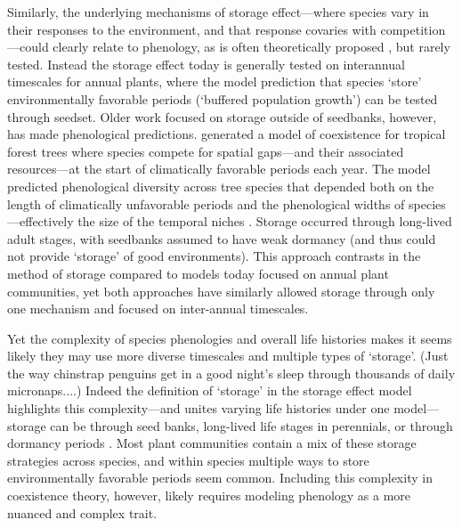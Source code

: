 \documentclass[11pt]{article}
\begin{document}
Similarly, the underlying mechanisms of storage effect---where species vary in their responses to the environment, and that response covaries with competition---could clearly relate to phenology, as is often theoretically proposed \citep{Chesson:1993gi,Chesson:2004eo}, but rarely tested. Instead the storage effect today is generally tested on interannual timescales for annual plants, where the model prediction that species `store' environmentally favorable periods (`buffered population growth') can be tested through seedset. Older work focused on storage outside of seedbanks, however, has made phenological predictions. \citet{Kubo:1996qe} generated a model of coexistence for tropical forest trees where species compete for spatial gaps---and their associated resources---at the start of climatically favorable periods each year. The model predicted phenological diversity across tree species that depended both on the length of climatically unfavorable periods and the phenological widths of species---effectively the size of the temporal niches \citep{Kubo:1996qe}. Storage occurred through long-lived adult stages, with seedbanks assumed to have weak dormancy (and thus could not provide `storage' of good environments). This approach contrasts in the method of storage compared to models today focused on annual plant communities, yet both approaches have similarly allowed storage through only one mechanism and focused on inter-annual timescales.

Yet the complexity of species phenologies and overall life histories makes it seems likely they may use more diverse timescales and multiple types of `storage'. (Just the way chinstrap penguins get in a good night's sleep through thousands of daily micronaps....)  Indeed the definition of `storage' in the storage effect model highlights this complexity---and unites varying life histories under one model---storage can be through seed banks, long-lived life stages in perennials, or through dormancy periods \citep{Chesson:2000vd}. Most plant communities contain a mix of these storage strategies across species, and within species multiple ways to store environmentally favorable periods seem common. Including this complexity in coexistence theory, however, likely requires modeling phenology as a more nuanced and complex trait. %
\end{document}
